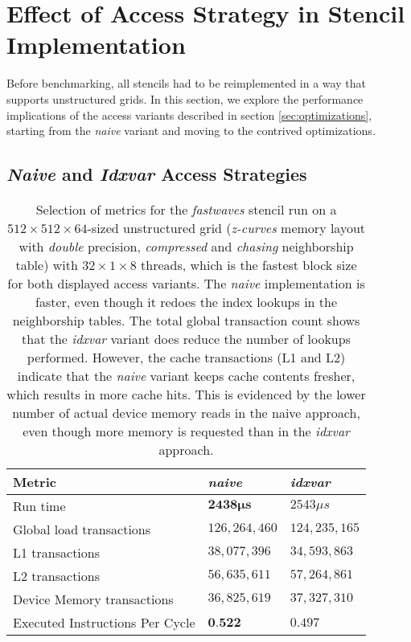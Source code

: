 \section{Effect of Access Strategy in Stencil Implementation} \label{sec:res-access}

Before benchmarking, all stencils had to be reimplemented in a way that supports unstructured grids. In this section, we explore the performance implications of the access variants described in section \ref{sec:optimizations}, starting from the \emph{naive} variant and moving to the contrived optimizations.

\subsection{\emph{Naive} and \emph{Idxvar} Access Strategies}

\begin{table}
	\begin{center}
    \begin{tabular}{l l l}
        \hline
        \textbf{Metric} & \textbf{\emph{naive}} & \textbf{\emph{idxvar}} \\
        \hline
        \hline
        Run time & $\mathbf{2438\mu s}$ & $2543\mu s$ \\
        Global load transactions & $126,264,460$ & $124,235,165$ \\
        L1 transactions & $38,077,396$ & $34,593,863$ \\
        L2 transactions & $56,635,611$ & $57,264,861$ \\
        Device Memory transactions & $36,825,619$ & $37,327,310$ \\
        Executed Instructions Per Cycle & $\textbf{0.522}$ & $0.497$ \\
        \hline
    \end{tabular}
	\end{center}
    \caption{\label{tab:fastwaves-naive-idxvar-metrics}Selection of metrics for the \emph{fastwaves} stencil run on a $512\times 512\times 64$-sized unstructured grid (\emph{z-curves} memory layout with \emph{double} precision, \emph{compressed} and \emph{chasing} neighborship table) with $32\times 1\times 8$ threads, which is the fastest block size for both displayed access variants. The \emph{naive} implementation is faster, even though it redoes the index lookups in the neighborship tables. The total global transaction count shows that the \emph{idxvar} variant does reduce the number of lookups performed. However, the cache transactions (L1 and L2) indicate that the \emph{naive} variant keeps cache contents fresher, which results in more cache hits. This is evidenced by the lower number of actual device memory reads in the naive approach, even though more memory is requested than in the \emph{idxvar} approach.}
\end{table}

